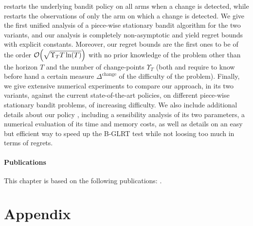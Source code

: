 \MUCB{} restarts the underlying \UCB{} bandit policy on all arms when a change is detected, while \CUSUMUCB{} restarts the observations of only the arm on which a change is detected.
%
We give the first unified analysis of a piece-wise stationary bandit algorithm for the two variants, and our analysis is completely non-asymptotic and yield regret bounds with explicit constants.
Moreover, our regret bounds are the first ones to be of the order $\mathop{}\mathopen{}\mathcal{O}\mathopen{}\left(\sqrt{\Upsilon_T T \ln(T)}\right)$ with no prior knowledge of the problem other than the horizon $T$ and the number of change-points $\Upsilon_T$ (both \MUCB{} and \CUSUMUCB{} require to know before hand a certain measure $\Delta^{\text{change}}$ of the difficulty of the problem).
%
Finally, we give extensive numerical experiments to compare our approach, in its two variants, against the current state-of-the-art policies, on different piece-wise stationary bandit problems, of increasing difficulty.
%
We also include additional details about our policy \GLRklUCB, including a sensibility analysis of its two parameters, a numerical evaluation of its time and memory costs, as well as details on an easy but efficient way to speed up the B-GLRT test while not loosing too much in terms of regrets.


\vfill{}

\paragraph{Publications}

This chapter is based on the following publications: \cite{Besson2019GLRT,Besson2019Gretsi}.


\newpage
\graphicspath{{2-Chapters/6-Chapter/Images/}}










\section{Appendix}
\label{sec:6:appendix}


